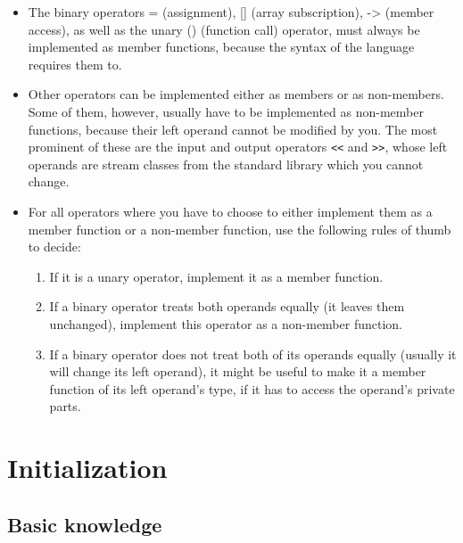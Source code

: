 \documentclass[a4paper,11pt,twoside]{book}
\begin{document}
\begin{itemize}
	\item The binary operators = (assignment), [] (array subscription), -> (member access), as well as the unary () (function call) operator, must always be implemented as member functions, because the syntax of the language requires them to.
	
	\item Other operators can be implemented either as members or as non-members. Some of them, however, usually have to be implemented as non-member functions, because their left operand cannot be modified by you. The most prominent of these are the input and output operators \texttt{<<} and \texttt{>>}, whose left operands are stream classes from the standard library which you cannot change.
	
	\item For all operators where you have to choose to either implement them as a member function or a non-member function, use the following rules of thumb to decide:
	\begin{enumerate}
		\item If it is a unary operator, implement it as a member function.
		
		\item If a binary operator treats both operands equally (it leaves them unchanged), implement this operator as a non-member function.
		
		\item If a binary operator does not treat both of its operands equally (usually it will change its left operand), it might be useful to make it a member function of its left operand’s type, if it has to access the operand's private parts.
	\end{enumerate}
	
\end{itemize}


\chapter{Initialization}
\section{Basic knowledge}
\end{document}
